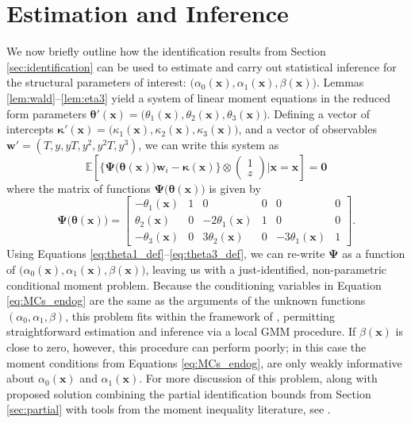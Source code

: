 \section{Estimation and Inference}
\label{sec:inference}
We now briefly outline how the identification results from Section \ref{sec:identification} can be used to estimate and carry out statistical inference for the structural parameters of interest: $\big(\alpha_0(\mathbf{x}), \alpha_1(\mathbf{x}), \beta(\mathbf{x})\big)$.
Lemmas \ref{lem:wald}--\ref{lem:eta3} yield a system of linear moment equations in the reduced form parameters $\boldsymbol{\theta}'(\mathbf{x}) = \big(\theta_1(\mathbf{x}), \theta_2(\mathbf{x}),\theta_3(\mathbf{x})\big)$.
Defining a vector of intercepts $\boldsymbol{\kappa}'(\mathbf{x}) = \big(\kappa_1(\mathbf{x}), \kappa_2(\mathbf{x}), \kappa_3(\mathbf{x})\big)$,
and a vector of observables $\mathbf{w}' = (T, y, yT, y^2, y^2 T, y^3)$, we can write this system as
\begin{equation}
\mathbb{E}\left[
  \bigg\{\boldsymbol{\Psi}\big(\boldsymbol{\theta}(\mathbf{x})\big)\mathbf{w}_i - \boldsymbol{\kappa}(\mathbf{x})\bigg\} \otimes 
\left(
\begin{array}{c}
  1 \\ z
\end{array}\right)\Bigg| \mathbf{x} = \boldsymbol{x}
\right] = \mathbf{0}
\label{eq:MCs_endog}
\end{equation}
where the matrix of functions $\boldsymbol{\Psi}\big(\boldsymbol{\theta}(\mathbf{x})\big)$ is given by 
\[
  \boldsymbol{\Psi}\big(\boldsymbol{\theta}(\mathbf{x})\big) = 
  \left[
  \begin{array}{rrrrrr}
    -\theta_1(\mathbf{x}) & 1 & 0 & 0 & 0 & 0\\
    \theta_2(\mathbf{x}) & 0 & -2\theta_1(\mathbf{x}) & 1 & 0 & 0\\ 
    -\theta_3(\mathbf{x}) & 0 & 3\theta_2(\mathbf{x}) & 0 & -3\theta_1(\mathbf{x}) & 1
\end{array}\right].
\]
Using Equations \ref{eq:theta1_def}--\ref{eq:theta3_def}, we can re-write  $\mathbf{\Psi}$ as a function of $\big(\alpha_0(\mathbf{x}), \alpha_1(\mathbf{x}), \beta(\mathbf{x})\big)$, leaving us with a just-identified, non-parametric conditional moment problem.
Because the conditioning variables in Equation \ref{eq:MCs_endog} are the same as the arguments of the unknown functions $(\alpha_0, \alpha_1, \beta)$, this problem fits within the framework of \cite{Lewbel2007}, permitting straightforward estimation and inference via a local GMM procedure. 
If $\beta(\mathbf{x})$ is close to zero, however, this procedure can perform poorly; in this case the moment conditions from Equations \ref{eq:MCs_endog}, are only weakly informative about $\alpha_0(\mathbf{x})$ and $\alpha_1(\mathbf{x})$.
For more discussion of this problem, along with proposed solution combining the partial identification bounds from Section \ref{sec:partial} with tools from the moment inequality literature, see  \cite{DiTragliaGarciaWP2017}.
